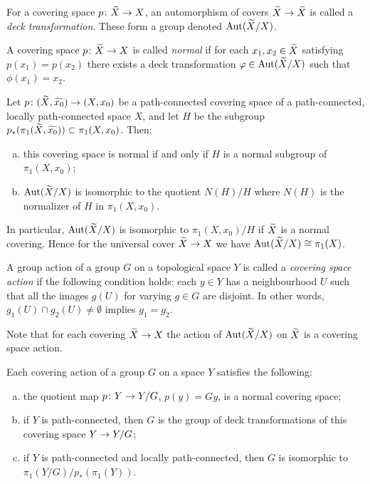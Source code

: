 \begin{definition}
  For a covering space $p \colon \widetilde{X} \rightarrow X$, an automorphism of covers $\widetilde{X} \rightarrow \widetilde{X}$ is called a \emph{deck transformation}. These form a group denoted $\operatorname{Aut}(\widetilde{X}/X)$.
\end{definition}

\begin{definition}
  A covering space $p \colon \widetilde{X} \rightarrow X$ is called \emph{normal} if for each $x_1, x_2 \in \widetilde{X}$ satisfying $p(x_1) = p(x_2)$ there exists a deck transformation $\varphi \in \operatorname{Aut}(\widetilde{X}/X)$ such that $\phi(x_1) = x_2$.
\end{definition}

\begin{proposition}
  Let $p \colon (\widetilde{X},\widetilde{x_0}) \rightarrow (X,x_0)$ be a path-connected covering space of a path-connected, locally path-connected space $X$, and let $H$ be the subgroup $p_\ast(\pi_1(\widetilde{X},\widetilde{x_0})) \subset \pi_1(X,x_0)$. Then:
  \begin{enumerate}[(a)]
  \item this covering space is normal if and only if $H$ is a normal subgroup of $\pi_1(X,x_0)$;
  \item $\operatorname{Aut}(\widetilde{X}/X)$ is isomorphic to the quotient $N(H)/H$ where $N(H)$ is the normalizer of $H$ in $\pi_1(X,x_0)$.
  \end{enumerate}
  In particular, $\operatorname{Aut}(\widetilde{X}/X)$ is isomorphic to $\pi_1(X,x_0)/H$ if $\widetilde{X}$ is a normal covering. Hence for the universal cover $\widetilde{X} \rightarrow X$ we have $\operatorname{Aut}(\widetilde{X}/X) \cong \pi_1(X)$.
\end{proposition}

\begin{definition}
  A group action of a group $G$ on a topological space $Y$ is called a \emph{covering space action} if the following condition holds: each $y \in Y$ has a neighbourhood $U$ such that all the images $g(U)$ for varying $g \in G$ are disjoint. In other words, $g_1(U) \cap g_2(U) \neq \emptyset$ implies $g_1 = g_2$.
\end{definition}

Note that for each covering $\widetilde{X} \rightarrow X$ the action of $\operatorname{Aut}(\widetilde{X}/X)$ on $\widetilde{X}$ is a covering space action.

\begin{proposition}
  Each covering action of a group $G$ on a space $Y$ satisfies the following:
  \begin{enumerate}[(a)]
  \item the quotient map $p \colon Y \rightarrow Y/G$, $p(y) = G y$, is a normal covering space;
  \item if $Y$ is path-connected, then $G$ is the group of deck transformations of this covering space $Y \rightarrow Y/G$;
    \item if $Y$ is path-connected and locally path-connected, then $G$ is isomorphic to $\pi_1(Y/G)/p_\ast(\pi_1(Y))$.
  \end{enumerate}
\end{proposition}

